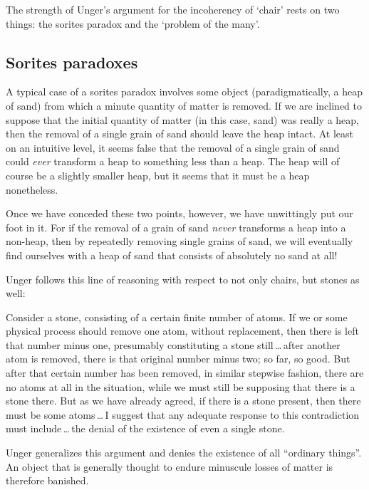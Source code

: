 \documentclass[11pt]{article}
\newenvironment{squote}{%
       \begin{spacing}{1}
       \begin{list}{}{%
       \setlength{\labelwidth}{0pt}%
       \rightmargin\leftmargin%
       }
       \item\relax
       }{%
       \end{list}%
       \end{spacing}
}
\begin{document}
\begin{spacing}{1}
The strength of Unger's argument for the incoherency of `chair' rests
on two things: the sorites paradox and the `problem of the many'.

\subsection{Sorites paradoxes}
A typical case of a sorites paradox involves some object
(paradigmatically, a heap of sand) from which a minute quantity of
matter is removed.  If we are inclined to suppose that the initial
quantity of matter (in this case, sand) was really a heap, then the
removal of a single grain of sand should leave the heap intact.  At
least on an intuitive level, it seems false that the removal of a
single grain of sand could {\em ever} transform a heap to something
less than a heap.  The heap will of course be a slightly smaller heap,
but it seems that it must be a heap nonetheless.

Once we have conceded these two points, however, we have unwittingly
put our foot in it.  For if the removal of a grain of sand {\em never}
transforms a heap into a non-heap, then by repeatedly removing single
grains of sand, we will eventually find ourselves with a heap of sand
that consists of absolutely no sand at all!

Unger follows this line of reasoning with respect to not only chairs,
but stones as well:

\begin{squote}
Consider a stone, consisting of a certain finite number of atoms.  If
we or some physical process should remove one atom, without
replacement, then there is left that number minus one, presumably
constituting a stone still\,\ldots\,after another atom is removed,
there is that original number minus two; so far, so good.  But after
that certain number has been removed, in similar stepwise fashion,
there are no atoms at all in the situation, while we must still be
supposing that there is a stone there.  But as we have already agreed,
if there is a stone present, then there must be some atoms\,\ldots\,I
suggest that any adequate response to this contradiction must
include\,\ldots\,the denial of the existence of even a single
stone.~\citep[121--122]{unger1979}
\end{squote}

Unger generalizes this argument and denies the existence of all
``ordinary things''.  An object that is generally thought to endure
minuscule losses of matter is therefore banished.


\end{spacing}
\end{document}
